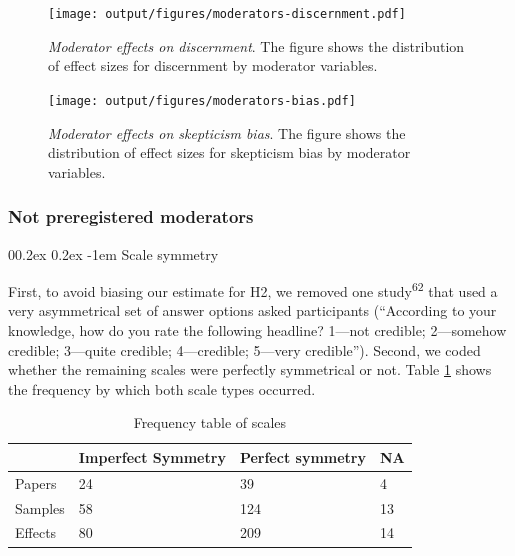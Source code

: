 \documentclass[
  doc,floatsintext]{apa6}
\makeatletter
\let\oldparagraph\paragraph
\renewcommand{\paragraph}{
    \@ifstar
      \xxxParagraphStar
      \xxxParagraphNoStar
  }
\newcommand{\xxxParagraphStar}[1]{\oldparagraph*{#1}\mbox{}}
\newcommand{\xxxParagraphNoStar}[1]{\oldparagraph{#1}\mbox{}}
\renewcommand{\paragraph}{\@startsection{paragraph}{4}{\parindent}%
  {0\baselineskip \@plus 0.2ex \@minus 0.2ex}%
  {-1em}%
  {\normalfont\normalsize\bfseries\itshape\typesectitle}}
\makeatother
\begin{document}
\begin{figure}
\centering
\texttt{[image: output/figures/moderators-discernment.pdf]}
\caption{\label{fig:moderators-discernment}\emph{Moderator effects on discernment}. The figure shows the distribution of effect sizes for discernment by moderator variables.}
\end{figure}



\begin{figure}
\centering
\texttt{[image: output/figures/moderators-bias.pdf]}
\caption{\label{fig:moderators-bias}\emph{Moderator effects on skepticism bias}. The figure shows the distribution of effect sizes for skepticism bias by moderator variables.}
\end{figure}

\subsubsection{Not preregistered moderators}\label{not-preregistered-moderators}

\paragraph{Scale symmetry}\label{scale-symmetry}

First, to avoid biasing our estimate for H2, we removed one study\textsuperscript{62} that used a very asymmetrical set of answer options asked participants (``According to your knowledge, how do you rate the following headline? 1---not credible; 2---somehow credible; 3---quite credible; 4---credible; 5---very credible''). Second, we coded whether the remaining scales were perfectly symmetrical or not. Table \ref{tab:n-symmetry} shows the frequency by which both scale types occurred.

\begin{table}[tbp]

\begin{center}
\begin{threeparttable}

\caption{\label{tab:n-symmetry}Frequency table of scales}

\begin{tabular}{llll}
\toprule
 & \multicolumn{1}{c}{Imperfect Symmetry} & \multicolumn{1}{c}{Perfect symmetry} & \multicolumn{1}{c}{NA}\\
\midrule
Papers & 24 & 39 & 4\\
Samples & 58 & 124 & 13\\
Effects & 80 & 209 & 14\\
\bottomrule
\end{tabular}

\end{threeparttable}
\end{center}

\end{table}
\end{document}
